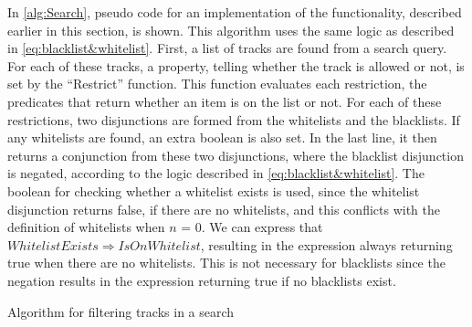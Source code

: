 In \cref{alg:Search}, pseudo code for an implementation of the functionality, described earlier in this section, is shown. This algorithm uses the same logic as described in \cref{eq:blacklist&whitelist}. First, a list of tracks are found from a search query. For each of these tracks, a property, telling whether the track is allowed or not, is set by the \enquote{Restrict} function. This function evaluates each restriction, the predicates that return whether an item is on the list or not. For each of these restrictions, two disjunctions are formed from the whitelists and the blacklists. If any whitelists are found, an extra boolean is also set. In the last line, it then returns a conjunction from these two disjunctions, where the blacklist disjunction is negated, according to the logic described in \cref{eq:blacklist&whitelist}. The boolean for checking whether a whitelist exists is used, since the whitelist disjunction returns false, if there are no whitelists, and this conflicts with the definition of whitelists when $n$ = $0$. We can express that $WhitelistExists \Rightarrow IsOnWhitelist$, resulting in the expression always returning true when there are no whitelists. This is not necessary for blacklists since the negation results in the expression returning true if no blacklists exist.

\begin{algorithm}[htbp] \caption{Algorithm for filtering tracks in a search}\label{alg:Search}
\begin{algorithmic}[1]
		\EndFor{}
	\EndFunction{}\\
			\EndIf{}
		\EndFor{}
	\EndFunction{}
\end{algorithmic}
\end{algorithm}

